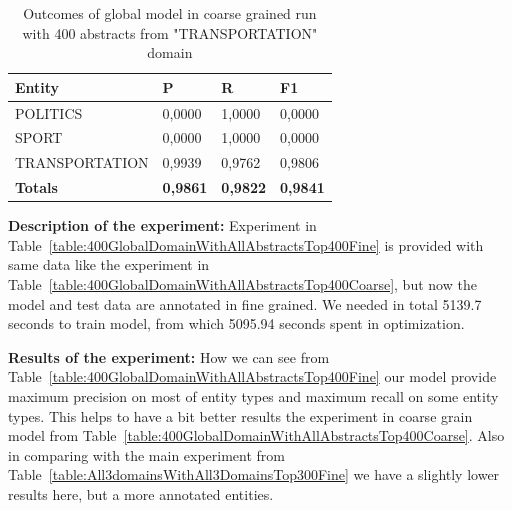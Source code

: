 \documentclass[thesis=M,english]{FITthesis}[2018/05/30]
\begin{document}
	\begin{table}[H]\centering
		\begin{tabular}{|l|l|l|l|}
			\hline {\textbf{Entity}} & {\textbf{P}} & {\textbf{R}} & {\textbf{F1}}\\\hline
				POLITICS & 0,0000 & 1,0000 & 0,0000\\
				SPORT & 0,0000 & 1,0000 & 0,0000\\
				TRANSPORTATION & 0,9939 & 0,9762 & 0,9806\\\hline
				\textbf{Totals} & \textbf{0,9861} & \textbf{0,9822} & \textbf{0,9841}\\\hline
		\end{tabular}
		\caption{Outcomes of global model in coarse grained run with 400 abstracts from "TRANSPORTATION" domain \label{table:400GlobalDomainWithTransportationTop400Coarse}}
	\end{table}	
		


\textbf{Description of the experiment:} Experiment in Table~\ref{table:400GlobalDomainWithAllAbstractsTop400Fine} is provided with same data like the experiment in Table~\ref{table:400GlobalDomainWithAllAbstractsTop400Coarse}, but now the model and test data are annotated in fine grained. We needed in total 5139.7 seconds to train model, from which 5095.94 seconds spent in optimization.

\textbf{Results of the experiment:} How we can see from Table~\ref{table:400GlobalDomainWithAllAbstractsTop400Fine} our model provide maximum precision on most of entity types and maximum recall on some entity types. This helps to have a bit better results the experiment in coarse grain model from Table~\ref{table:400GlobalDomainWithAllAbstractsTop400Coarse}. Also in comparing with the main experiment from Table~\ref{table:All3domainsWithAll3DomainsTop300Fine} we have a slightly lower results here, but a more annotated entities.
\end{document}
